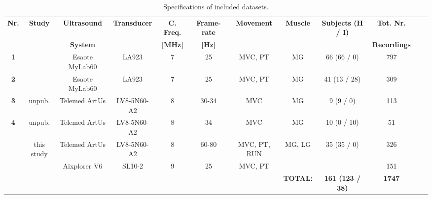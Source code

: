 \documentclass[journal,twoside,web]{ieeecolor}
\begin{document}
\begin{table*}[ht!]
    \caption{Specifications of included datasets.}
    \label{tab:studies}
    \setlength{\tabcolsep}{3pt} \begin{center}
    \begin{tabular}{cccccccccccc}
        \toprule
        \multirow{2}{*}{\textbf{Nr.}}
        &\multirow{2}{*}{\textbf{Study}}
        &\textbf{Ultrasound}
        &\multirow{2}{*}{\textbf{Transducer}}
        &\textbf{C. Freq.}
        &\textbf{Frame-rate}
        &\multirow{2}{*}{\textbf{Movement}}
        &\multirow{2}{*}{\textbf{Muscle}}
        &\multirow{2}{*}{\textbf{Subjects (H / I)}}
        &\textbf{Tot. Nr.}\\
&
        &\textbf{System}
        &
        &\textbf{[MHz]}
        &\textbf{[Hz]}
        &
        &
        &
        &\textbf{Recordings}\\
\midrule
        \rule{0pt}{12pt}
        \textbf{1}
        &\cite{j:Konrad2014:1,j:Konrad2015,j:Konrad2014:2} 
        &Esaote MyLab60 
        &LA923
        &7
        &25
        &MVC, PT  
        &MG 
        &66 (66 / 0)
        &797\\
\rule{0pt}{12pt}
        \textbf{2}
        &\cite{j:Kruse2017,j:Kruse2018,j:Kruse2019}
        &Esaote MyLab60
        &LA923
        &7 
        &25
        &MVC, PT
        &MG
        &41 (13 / 28)
        &309\\
\rule{0pt}{12pt}
        \textbf{3}
        &unpub.
        &Telemed ArtUs
        &LV8-5N60-A2
        &8 
        &30-34
        &MVC
        &MG
        &9 (9 / 0)
        &113\\
\rule{0pt}{12pt}
        \textbf{4}
        &unpub.
        &Telemed ArtUs
        &LV8-5N60-A2
        &8 
        &34
        &MVC
        &MG
        &10 (0 / 10)
        &51\\
\rule{0pt}{12pt}
        \multirow{2}{*}{\textbf{5}}
        &\multirow{2}{*}{this study}  
        &Telemed ArtUs
        &LV8-5N60-A2
        &8
        &60-80
        &MVC, PT, RUN
        &\multirow{2}{*}{MG, LG}
        &\multirow{2}{*}{35 (35 / 0)}
        &326\\ 
&
        &Aixplorer V6
        &SL10-2
        &9
        &25
        &MVC, PT
        &
        &
        &151\\ 
        \bottomrule
        \addlinespace[4pt]
&
        &
        &
        &
        &
        &
        &\textbf{\small TOTAL:}
        &\textbf{\small 161 (123 / 38)}
        &\textbf{\small 1747}\\

\end{tabular}
\end{center}
\end{table*}
\end{document}
